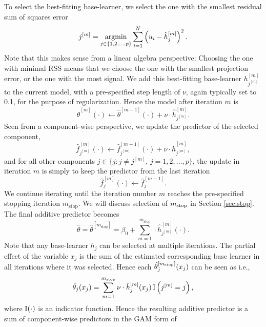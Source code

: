 To select the best-fitting base-learner, we select the one with the smallest residual sum of squares error
\begin{equation*}
    j^{[m]}=\operatorname*{argmin}_{j\in\{1,2,\ldots,p\}}\sum_{i=1}^N \left(u_i-\hat{h}_j^{[m]}\right)^2.
\end{equation*}
Note that this makes sense from a linear algebra perspective:
Choosing the one with minimal RSS means that we choose the one with the smallest projection error, or the one with the most signal.
We add this best-fitting base-learner $h_{j^{[m]}}^{[m]}$ to the current model, with a pre-specified step length of $\nu$, again typically set to 0.1, for the purpose of regularization.
Hence the model after iteration $m$ is
\begin{equation*}
    \hat{\theta}^{[m]}(\cdot)\gets \hat{\theta}^{[m-1]}(\cdot)+\nu\cdot\hat{h}^{[m]}_{j^{[m]}}.
\end{equation*}
Seen from a component-wise perspective, we update the predictor of the selected component,
\begin{equation*}
    \hat{f}_{j^{[m]}}^{[m]}(\cdot)\gets \hat{f}_{j^{[m]}}^{[m-1]}(\cdot)+\nu\cdot\hat{h}^{[m]}_{j^{[m]}},
\end{equation*}
and for all other components $j\in\{j\colon j\neq j^{[m]},\,j=1,2,\ldots,p\}$, the update in iteration $m$ is simply
to keep the predictor from the last iteration
\begin{equation*}
    \hat{f}_{j}^{[m]}(\cdot)\gets \hat{f}_{j}^{[m-1]}.
\end{equation*}
We continue iterating until the iteration number $m$ reaches the pre-specified stopping iteration $m_{\text{stop}}$.
We will discuss selection of $m_{\text{stop}}$ in Section \ref{sec:stop}.
The final additive predictor becomes
\begin{equation*}
    \hat{\theta}=\hat{\theta}^{[m_{\text{stop}}]}=\beta_0 + \sum_{m=1}^{m_{\text{stop}}}\cdot\hat{h}_{j^{[m]}}^{[m]}(\cdot).
\end{equation*}
Note that any base-learner $h_j$ can be selected at multiple iterations.
The partial effect of the variable $x_j$ is the sum of the estimated corresponding base learner in all iterations where it was selected.
Hence each $\hat{\theta}_j^{[m_{\text{stop}}]}(x_j)$ can be seen as
i.e.,
\begin{equation*}
    \hat{\theta}_j(x_j)=\sum_{m=1}^{m_{\text{stop}}}\nu\cdot\hat{h}_j^{[m]}(x_j)\operatorname{I}\left(j^{[m]}=j\right),
\end{equation*}
where $\operatorname{I}(\cdot)$ is an indicator function.
Hence the resulting additive predictor is a sum of component-wise predictors in the GAM form of
